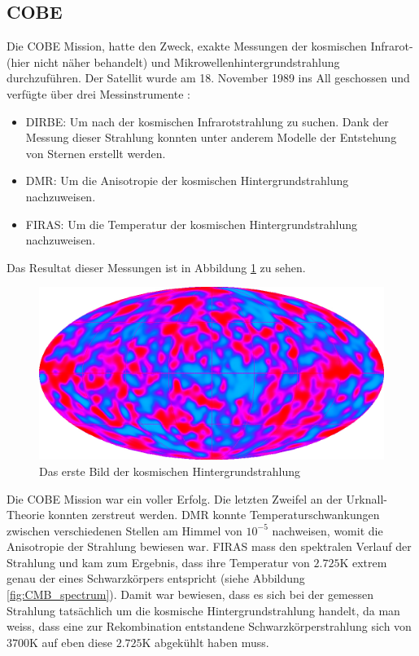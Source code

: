 \subsection{\ac{COBE}}
Die \ac{COBE} Mission, hatte den Zweck, exakte 
Messungen der kosmischen Infrarot-(hier nicht näher behandelt) und 
Mikrowellenhintergrundstrahlung durchzuführen.
Der Satellit wurde am 18. November 1989 ins All geschossen und verfügte über 
drei Messinstrumente \cite{COBE}:
\begin{itemize}
	\item \ac{DIRBE}: Um nach der 
	kosmischen Infrarotstrahlung zu suchen.
	Dank der Messung dieser Strahlung konnten unter anderem Modelle der 
	Entstehung von Sternen erstellt werden.
	\item \ac{DMR}: Um die Anisotropie der 
	kosmischen Hintergrundstrahlung nachzuweisen.
	\item \ac{FIRAS}: Um die Temperatur 
	der kosmischen Hintergrundstrahlung nachzuweisen. 
\end{itemize}

Das Resultat dieser Messungen ist in Abbildung \ref{fig:COBE} zu sehen.
\begin{figure}
	\includegraphics[width=\linewidth]{cmb/images/CMB_COBE.png}
	\caption{Das erste Bild der kosmischen Hintergrundstrahlung}
	\label{fig:COBE}
\end{figure}
Die \ac{COBE} Mission war ein voller Erfolg.
Die letzten Zweifel an der Urknall-Theorie konnten zerstreut werden.
\ac{DMR} konnte Temperaturschwankungen zwischen verschiedenen Stellen am Himmel 
von $10^{-5}$ nachweisen, womit die Anisotropie der Strahlung bewiesen war.
\ac{FIRAS} mass den spektralen Verlauf der Strahlung und kam zum Ergebnis, dass 
ihre Temperatur von $2.725 \text{K}$ extrem genau der eines Schwarzkörpers 
entspricht (siehe Abbildung \ref{fig:CMB_spectrum}).
Damit war bewiesen, dass es sich bei der gemessen Strahlung tatsächlich um die 
kosmische Hintergrundstrahlung handelt, da man weiss, dass eine zur 
Rekombination entstandene Schwarzkörperstrahlung sich von $3700 \text{K}$ auf 
eben diese $2.725 \text{K}$ abgekühlt haben muss.

